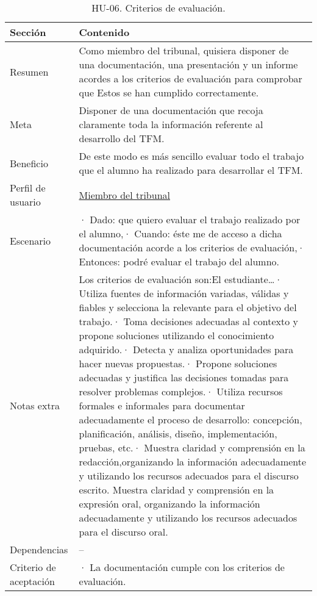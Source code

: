 \begin{table}[H]
    \centering
    \def\arraystretch{1.25}
    \begin{adjustbox}{max width=\textwidth}
    \begin{tabularx}{\textwidth}{|l|L|}
    \hline
        \textbf{Sección} & \textbf{Contenido} \\ \hline
    \hline
        Resumen & Como miembro del tribunal, quisiera disponer de una documentación, una presentación y un informe acordes a los criterios de evaluación para comprobar que Estos se han cumplido correctamente. \\ \hline
        Meta & Disponer de una documentación que recoja claramente toda la información referente al desarrollo del TFM. \\ \hline
        Beneficio & De este modo es más sencillo evaluar todo el trabajo que el alumno ha realizado para desarrollar el TFM. \\ \hline
        Perfil de usuario & \hyperref[sec:personaMiembroTribunal]{Miembro del tribunal} \\ \hline
        Escenario & · Dado: que quiero evaluar el trabajo realizado por el alumno,\linebreak · Cuando: éste me de acceso a dicha documentación acorde a los criterios de evaluación,\linebreak · Entonces: podré evaluar el trabajo del alumno. \\ \hline
        Notas extra & Los criterios de evaluación son:\linebreak \linebreak El estudiante…\linebreak · Utiliza fuentes de información variadas, válidas y fiables y selecciona la relevante para el objetivo del trabajo.\linebreak · Toma decisiones adecuadas al contexto y propone soluciones utilizando el conocimiento adquirido.\linebreak · Detecta y analiza oportunidades para hacer nuevas propuestas.\linebreak · Propone soluciones adecuadas y justifica las decisiones tomadas para resolver problemas complejos.\linebreak · Utiliza recursos formales e informales para documentar adecuadamente el proceso de desarrollo: concepción, planificación, análisis, diseño, implementación, pruebas, etc.\linebreak · Muestra claridad y comprensión en la redacción,organizando la información adecuadamente y utilizando los recursos adecuados para el discurso escrito. Muestra claridad y comprensión en la expresión oral, organizando la información adecuadamente y utilizando los recursos adecuados para el discurso oral. \\ \hline
        Dependencias & – \\ \hline
        Criterio de aceptación & · La documentación cumple con los criterios de evaluación. \\ \hline
    \end{tabularx}
    \end{adjustbox}
    \caption{HU-06. Criterios de evaluación.}
\end{table}
  
